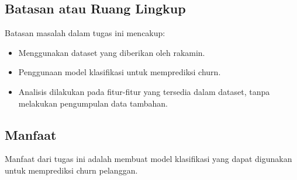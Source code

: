\subsection{Batasan atau Ruang Lingkup}
Batasan masalah dalam tugas ini mencakup:
\begin{itemize}
    \item Menggunakan dataset yang diberikan oleh rakamin.
    \item Penggunaan model klasifikasi untuk memprediksi churn.
    \item Analisis dilakukan pada fitur-fitur yang tersedia dalam dataset, tanpa melakukan pengumpulan data tambahan.
\end{itemize}

\subsection{Manfaat}
Manfaat dari tugas ini adalah membuat model klasifikasi yang dapat digunakan untuk memprediksi churn pelanggan.
\newpage